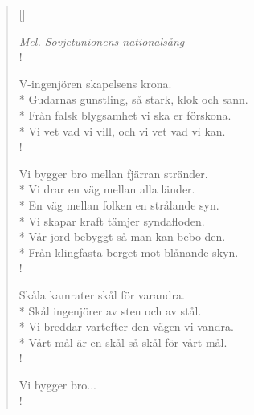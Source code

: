 
\settowidth{\versewidth}{Gudarnas gunstling, så stark}



\begin{verse}[\versewidth]

\flagverse{}
\emph{Mel. Sovjetunionens nationalsång}\\!

V-ingenjören skapelsens krona.\\*
Gudarnas gunstling, så stark, klok och sann.\\*
Från falsk blygsamhet vi ska er förskona.\\*
Vi vet vad vi vill, och vi vet vad vi kan.\\!


Vi bygger bro mellan fjärran stränder.\\*
Vi drar en väg mellan alla länder.\\*
En väg mellan folken en strålande syn.\\*
Vi skapar kraft tämjer syndafloden.\\*
Vår jord bebyggt så man kan bebo den.\\*
Från klingfasta berget mot blånande skyn.\\!


Skåla kamrater skål för varandra.\\*
Skål ingenjörer av sten och av stål.\\*
Vi breddar vartefter den vägen vi vandra.\\*
Vårt mål är en skål så skål för vårt mål.\\!


Vi bygger bro...\\!

\end{verse}

